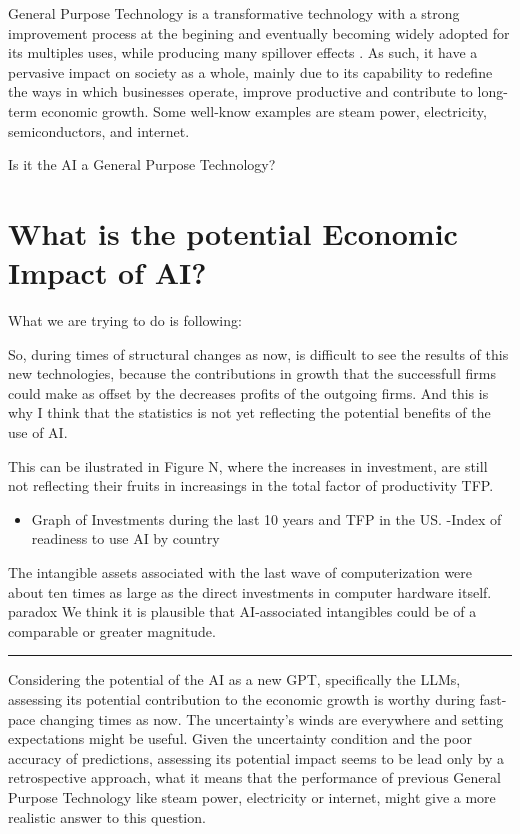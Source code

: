 \documentclass[preprint, 3p,
authoryear]{elsarticle} %
\providecommand{\tightlist}{%
  \setlength{\itemsep}{0pt}\setlength{\parskip}{0pt}}
\begin{document}
General Purpose Technology is a transformative technology with a strong
improvement process at the begining and eventually becoming widely
adopted for its multiples uses, while producing many spillover effects
\citep{paradox}. As such, it have a pervasive impact on society as a
whole, mainly due to its capability to redefine the ways in which
businesses operate, improve productive and contribute to long-term
economic growth. Some well-know examples are steam power, electricity,
semiconductors, and internet.

Is it the AI a General Purpose Technology?

\hypertarget{what-is-the-potential-economic-impact-of-ai}{%
\section{What is the potential Economic Impact of
AI?}\label{what-is-the-potential-economic-impact-of-ai}}

What we are trying to do is following:

So, during times of structural changes as now, is difficult to see the
results of this new technologies, because the contributions in growth
that the successfull firms could make as offset by the decreases profits
of the outgoing firms. And this is why I think that the statistics is
not yet reflecting the potential benefits of the use of AI.

This can be ilustrated in Figure N, where the increases in investment,
are still not reflecting their fruits in increasings in the total factor
of productivity TFP.

\begin{itemize}
\tightlist
\item
  Graph of Investments during the last 10 years and TFP in the US.
  -Index of readiness to use AI by country
\end{itemize}

The intangible assets associated with the last wave of computerization
were about ten times as large as the direct investments in computer
hardware itself. paradox We think it is plausible that AI-associated
intangibles could be of a comparable or greater magnitude.

\begin{center}\rule{0.5\linewidth}{0.5pt}\end{center}

Considering the potential of the AI as a new GPT, specifically the LLMs,
assessing its potential contribution to the economic growth is worthy
during fast-pace changing times as now. The uncertainty's winds are
everywhere and setting expectations might be useful. Given the
uncertainty condition and the poor accuracy of predictions, assessing
its potential impact seems to be lead only by a retrospective approach,
what it means that the performance of previous General Purpose
Technology like steam power, electricity or internet, might give a more
realistic answer to this question.
\end{document}
